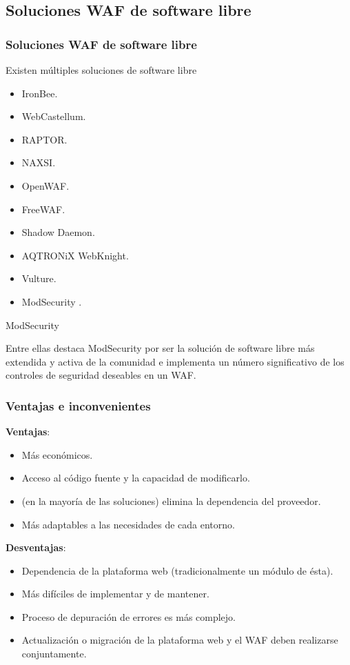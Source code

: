 \subsection{Soluciones WAF de software libre}
\begin{frame}[shrink]
  \frametitle{Soluciones WAF de software libre}
  Existen múltiples soluciones de software libre
  \begin{itemize}
    \item IronBee\cite{IronBee}.
    \item WebCastellum\cite{WebCastellum}.
    \item RAPTOR\cite{raptor}.
    \item NAXSI\cite{NAXSI}.
    \item OpenWAF\cite{openwaf}.
    \item FreeWAF\cite{freewaf}.
    \item Shadow Daemon\cite{ShadowDaemon}.
    \item AQTRONiX WebKnight\cite{WebKnight}.
    \item Vulture\cite{vulture}.
    \item ModSecurity \cite{modsecurity}.
  \end{itemize}
  \begin{block}{ModSecurity}
  \par Entre ellas destaca ModSecurity por ser la solución de software libre más extendida y activa de la comunidad e implementa un número significativo de los controles de seguridad deseables en un WAF.
  \end{block}
\end{frame}

\begin{frame}[shrink]
  \frametitle{Ventajas e inconvenientes}
  {\bf Ventajas}:
  \begin{itemize}
    \item Más económicos.
    \item Acceso al código fuente y la capacidad de modificarlo.
    \item (en la mayoría de las soluciones) elimina la dependencia del proveedor.
    \item Más adaptables a las necesidades de cada entorno.
  \end{itemize}
  {\bf Desventajas}:
  \begin{itemize}
    \item Dependencia de la plataforma web (tradicionalmente un módulo de ésta).
    \item Más difíciles de implementar y de mantener.
    \item Proceso de depuración de errores es más complejo.
    \item Actualización o migración de la plataforma web y el WAF deben realizarse conjuntamente.
  \end{itemize}
\end{frame}


